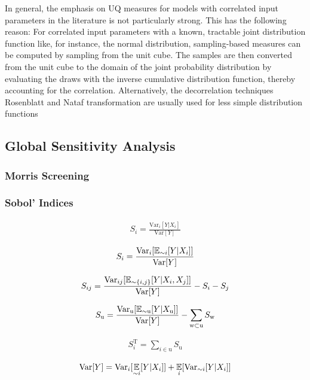 In general, the emphasis on UQ measures for models with correlated input parameters in the literature is not particularly strong.
This has the following reason: For correlated input parameters with a known, tractable joint distribution function like, for instance, the normal distribution, sampling-based measures can be computed by sampling from the unit cube. The samples are then converted from the unit cube to the domain of the joint probability distribution by evaluating the draws with the inverse cumulative distribution function, thereby accounting for the correlation. Alternatively, the decorrelation techniques Rosenblatt and Nataf transformation are usually used for less simple distribution functions



\subsection{Global Sensitivity Analysis}
\subsubsection{Morris Screening}
\cite{Morris.1991}
\subsubsection{Sobol' Indices}

\begin{align}
S_i = \frac{\text{Var}_i[Y|X_i ]}{\text{Var}[Y]}
\end{align}

\begin{align}
S_i = \frac{\text{Var}_i[\operatorname*{\mathbb{E}}_{\sim i}[Y|X_i ]]}{\text{Var}[Y]}
\end{align}

\begin{align}
S_{ij} = \frac{\text{Var}_{ij}[\operatorname*{\mathbb{E}}_{\sim \{i,j\}}[Y|X_i, X_j ]]}{\text{Var}[Y]} - S_i - S_j
\end{align}

\begin{align}
S_\text{u} = \frac{\text{Var}_\text{u}[\operatorname*{\mathbb{E}}_{\sim \text{u}}[Y|X_\text{u} ]]}{\text{Var}[Y]} - \sum_{\text{w} \subset \text{u}} S_\text{w}
\end{align}

\begin{align}
S_i^\text{T} = \sum_{i \in \text{u}} S_\text{u}
\end{align}

\begin{align}
\text{Var}[Y] = \text{Var}_i[\operatorname*{\mathbb{E}}_{\sim i}[Y|X_i]] + \operatorname*{\mathbb{E}}_{i}[\text{Var}_{\sim i}[Y|X_i]]
\end{align}

